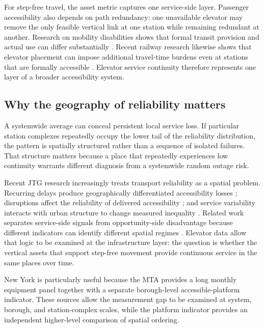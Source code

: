 For step-free travel, the asset metric captures one service-side layer. Passenger accessibility also depends on path redundancy: one unavailable elevator may remove the only feasible vertical link at one station while remaining redundant at another. Research on mobility disabilities shows that formal transit provision and actual use can differ substantially \citep{liu2023}. Recent railway research likewise shows that elevator placement can impose additional travel-time burdens even at stations that are formally accessible \citep{arai2026}. Elevator service continuity therefore represents one layer of a broader accessibility system.

\subsection{Why the geography of reliability matters}

A systemwide average can conceal persistent local service loss. If particular station complexes repeatedly occupy the lower tail of the reliability distribution, the pattern is spatially structured rather than a sequence of isolated failures. That structure matters because a place that repeatedly experiences low continuity warrants different diagnosis from a systemwide random outage risk.

Recent JTG research increasingly treats transport reliability as a spatial problem. Recurring delays produce geographically differentiated accessibility losses \citep{nichols2024}; disruptions affect the reliability of delivered accessibility \citep{liu2024}; and service variability interacts with urban structure to change measured inequality \citep{braga2026}. Related work separates service-side signals from opportunity-side disadvantage because different indicators can identify different spatial regimes \citep{kang2026}. Elevator data allow that logic to be examined at the infrastructure layer: the question is whether the vertical assets that support step-free movement provide continuous service in the same places over time.

New York is particularly useful because the MTA provides a long monthly equipment panel together with a separate borough-level accessible-platform indicator. These sources allow the measurement gap to be examined at system, borough, and station-complex scales, while the platform indicator provides an independent higher-level comparison of spatial ordering.
